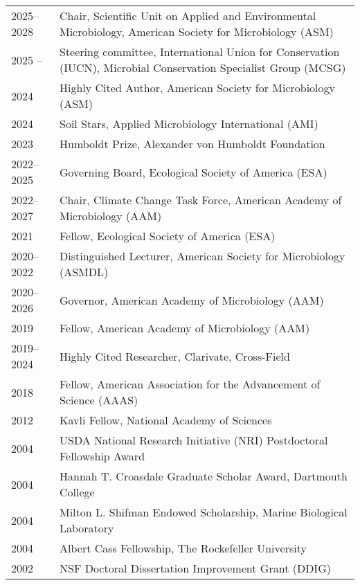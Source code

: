 \documentclass[11pt]{article}  %
\begin{document}
\begin{tabularx}{\textwidth}{@{}l@{\hspace{2em}}X@{}}
2025--2028  & Chair, Scientific Unit on Applied and Environmental Microbiology, American Society for Microbiology (ASM) \\
2025 --     & Steering committee, International Union for Conservation (IUCN), Microbial Conservation Specialist Group (MCSG)\\
2024        & Highly Cited Author, American Society for Microbiology (ASM) \\
2024        & Soil Stars, Applied Microbiology International (AMI) \\ 
2023        & Humboldt Prize, Alexander von Humboldt Foundation \\
2022--2025  & Governing Board, Ecological Society of America (ESA) \\
2022--2027  & Chair, Climate Change Task Force, American Academy of Microbiology (AAM) \\
2021        & Fellow, Ecological Society of America (ESA) \\
2020--2022  & Distinguished Lecturer, American Society for Microbiology (ASMDL) \\
2020--2026  & Governor, American Academy of Microbiology (AAM) \\
2019        & Fellow, American Academy of Microbiology (AAM) \\
2019--2024  & Highly Cited Researcher, Clarivate, Cross-Field \\
2018        & Fellow, American Association for the Advancement of Science (AAAS) \\
2012        & Kavli Fellow, National Academy of Sciences \\
2004        & USDA National Research Initiative (NRI) Postdoctoral Fellowship Award \\
2004        & Hannah T. Croasdale Graduate Scholar Award, Dartmouth College \\
2004        & Milton L. Shifman Endowed Scholarship, Marine Biological Laboratory \\
2004        & Albert Cass Fellowship, The Rockefeller University \\
2002        & NSF Doctoral Dissertation Improvement Grant (DDIG) \\
\end{tabularx}
\end{document}
